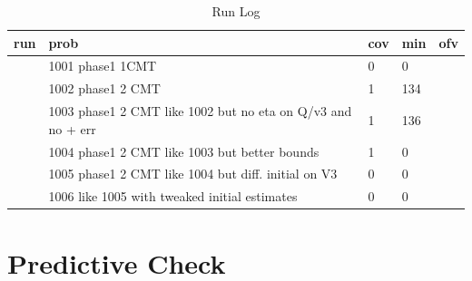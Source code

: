 \begin{table}[!htpb]
 \caption[Run Log]{Run Log \label{runlog}}
 \begin{center}
  \begin{tabular}{rlllr}
    \hline \hline
   run & prob & cov & min & ofv \\ \hline
   \verb#1001# & 1001 phase1 1CMT                                            & 0 & 0   & \verb#2526.40# \\
   \verb#1002# & 1002 phase1 2 CMT                                           & 1 & 134 & \verb#2525.97# \\
   \verb#1003# & 1003 phase1 2 CMT like 1002 but no eta on Q/v3 and no + err & 1 & 136 & \verb#2570.47# \\
   \verb#1004# & 1004 phase1 2 CMT like 1003 but better bounds               & 1 & 0   & \verb#2570.45# \\
   \verb#1005# & 1005 phase1 2 CMT like 1004 but diff. initial on V3         & 0 & 0   & \verb#2405.92# \\
   \verb#1006# & 1006 like 1005 with tweaked initial estimates               & 0 & 0   & \verb#2405.92# \\ \hline
  \end{tabular}
 \end{center}
\end{table}\section{Predictive Check}
